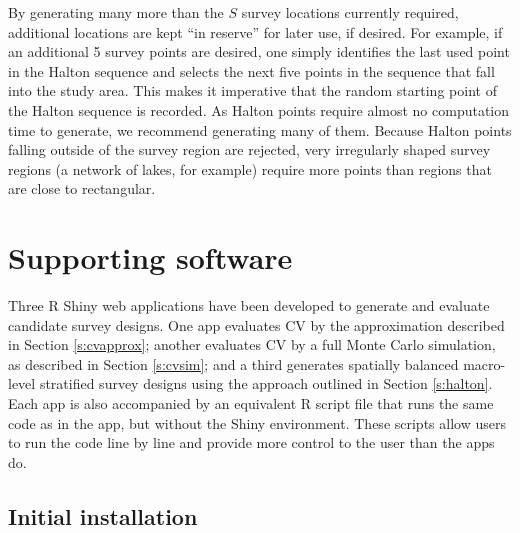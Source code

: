 \documentclass[a4paper,11pt, draft]{article} %
\begin{document}
By generating many more than the $S$ survey locations currently required, additional locations are kept ``in reserve'' for later use, if desired. For example, if an additional 5 survey points are desired, one simply identifies the last used point in the Halton sequence and selects the next five points in the sequence that fall into the study area. This makes it imperative that the random starting point of the Halton sequence is recorded. As Halton points require almost no computation time to generate, we recommend generating many of them. Because Halton points falling outside of the survey region are rejected, very irregularly shaped survey regions (a network of lakes, for example) require more points than regions that are close to rectangular.

\section{Supporting software}

Three R Shiny web applications have been developed to generate and evaluate candidate survey designs. One app evaluates CV by the approximation described in Section \ref{s:cvapprox}; another evaluates CV by a full Monte Carlo simulation, as described in Section \ref{s:cvsim}; and a third generates spatially balanced macro-level stratified survey designs using the approach outlined in Section \ref{s:halton}. Each app is also accompanied by an equivalent R script file that runs the same code as in the app, but without the Shiny environment. These scripts allow users to run the code line by line and provide more control to the user than the apps do. 

\subsection{Initial installation}
\end{document}
